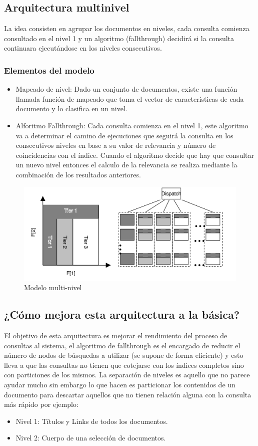\documentclass[a4paper, 11pt]{article} %
\begin{document}
		\subsection{Arquitectura multinivel}
		La idea consisten en agrupar los documentos en niveles, cada consulta comienza consultado en el nivel 1 y un algoritmo (fallthrough) decidirá si la consulta continuara ejecutándose en los niveles consecutivos.
		\subsubsection{Elementos del modelo}
		\begin{itemize}
			\item Mapeado de nivel: Dado un conjunto de documentos, existe una función llamada función de mapeado que toma el vector de características de cada documento y lo clasifica en un nivel.
			\item Alforitmo Fallthrough: Cada consulta comienza en el nivel 1, este algoritmo va a determinar el camino de ejecuciones que seguirá la consulta en los consecutivos niveles en base a su valor de relevancia y número de coincidencias con el índice. Cuando el algoritmo decide que hay que consultar un nuevo nivel entonces el calculo de la relevancia se realiza mediante la combinación de los resultados anteriores.
		\end{itemize}
		\begin{figure}[H]
				\centering
				\includegraphics[scale=0.75]{./img/multitier2.png}
				\caption{Modelo multi-nivel}
				\label{fig:my_label}
		\end{figure}
		\subsection{¿Cómo mejora esta arquitectura a la básica?}
		El objetivo de esta arquitectura es mejorar el rendimiento del proceso de consultas al sistema, el algoritmo de fallthrough es el encargado de reducir el número de nodos de búsquedas a utilizar (se supone de forma eficiente) y esto lleva a que las consultas no tienen que cotejarse con los índices completos sino con particiones de los mismos.
		La separación de niveles es aquello que no parece ayudar mucho sin embargo lo que hacen es particionar los contenidos de un documento para descartar aquellos que no tienen relación alguna con la consulta más rápido por ejemplo:
		\begin{itemize}
			\item Nivel 1: Títulos y Links de todos los documentos.
			\item Nivel 2: Cuerpo de una selección de documentos.
		\end{itemize}
\end{document}
